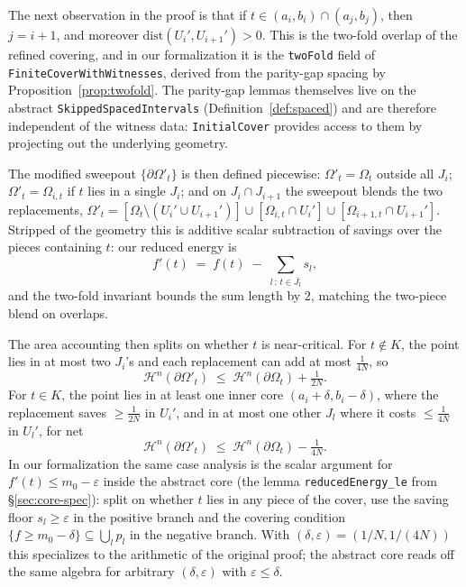 The next observation in the proof is that if $t \in (a_i, b_i)
\cap (a_j, b_j)$, then $j = i+1$, and moreover
$\mathrm{dist}(U_i', U_{i+1}') > 0$. This is the two-fold overlap
of the refined covering, and in our formalization it is the
\texttt{twoFold} field of \texttt{FiniteCoverWithWitnesses},
derived from the parity-gap spacing by
Proposition~\ref{prop:twofold}. The parity-gap lemmas themselves
live on the abstract \texttt{SkippedSpacedIntervals}
(Definition~\ref{def:spaced}) and are therefore independent of
the witness data: \texttt{InitialCover} provides access to them
by projecting out the underlying geometry.

The modified sweepout $\{\partial \Omega'_t\}$ is then defined
piecewise: $\Omega'_t = \Omega_t$ outside all $J_i$; $\Omega'_t =
\Omega_{i,t}$ if $t$ lies in a single $J_i$; and on
$J_i \cap J_{i+1}$ the sweepout blends the two replacements,
$\Omega'_t = [\Omega_t \setminus (U_i' \cup U_{i+1}')] \cup
[\Omega_{i,t} \cap U_i'] \cup [\Omega_{i+1,t} \cap U_{i+1}']$.
Stripped of the geometry this is additive scalar subtraction of
savings over the pieces containing $t$: our reduced energy is
\[
f'(t) \;=\; f(t) \;-\; \sum_{l \,:\, t \in \overline{J_l}} s_l,
\]
and the two-fold invariant bounds the sum length by $2$, matching
the two-piece blend on overlaps.

The area accounting then splits on whether $t$ is near-critical.
For $t \notin K$, the point lies in at most two $J_i$'s and each
replacement can add at most $\tfrac{1}{4N}$, so
\[
\mathcal{H}^n(\partial \Omega'_t) \;\le\;
\mathcal{H}^n(\partial \Omega_t) + \tfrac{1}{2N}.
\]
For $t \in K$, the point lies in at least one inner core
$(a_i + \delta, b_i - \delta)$, where the replacement saves
$\ge \tfrac{1}{2N}$ in $U_i'$, and in at most one other $J_l$
where it costs $\le \tfrac{1}{4N}$ in $U_l'$, for net
\[
\mathcal{H}^n(\partial \Omega'_t) \;\le\;
\mathcal{H}^n(\partial \Omega_t) - \tfrac{1}{4N}.
\]
In our formalization the same case analysis is the scalar
argument for $f'(t) \le m_0 - \varepsilon$ inside the abstract
core (the lemma \texttt{reducedEnergy\_le} from
\S\ref{sec:core-spec}): split on whether $t$ lies in any piece
of the cover, use the saving floor $s_l \ge \varepsilon$ in the
positive branch and the covering condition
$\{f \ge m_0 - \delta\} \subseteq \bigcup_l p_l$ in the negative
branch. With $(\delta, \varepsilon) = (1/N, 1/(4N))$ this
specializes to the arithmetic of the original proof; the
abstract core reads off the same algebra for arbitrary
$(\delta, \varepsilon)$ with $\varepsilon \le \delta$.

